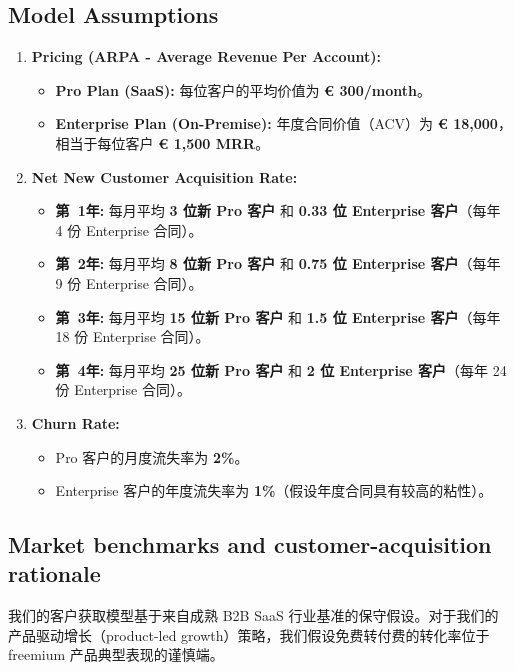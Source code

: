 \documentclass[11pt, a4paper, oneside]{article}
\begin{document}
\subsection{Model Assumptions}
\begin{enumerate}
    \item \textbf{Pricing (ARPA - Average Revenue Per Account):}
    \begin{itemize}
        \item \textbf{Pro Plan (SaaS):} 每位客户的平均价值为 \textbf{\euro{} 300/month}。
        \item \textbf{Enterprise Plan (On-Premise):} 年度合同价值（ACV）为 \textbf{\euro{} 18,000}，相当于每位客户 \textbf{\euro{} 1,500 MRR}。
    \end{itemize}

    \item \textbf{Net New Customer Acquisition Rate:}
    \begin{itemize}
        \item \textbf{第~1年:} 每月平均 \textbf{3 位新 Pro 客户} 和 \textbf{0.33 位 Enterprise 客户}（每年 4 份 Enterprise 合同）。
        \item \textbf{第~2年:} 每月平均 \textbf{8 位新 Pro 客户} 和 \textbf{0.75 位 Enterprise 客户}（每年 9 份 Enterprise 合同）。
        \item \textbf{第~3年:} 每月平均 \textbf{15 位新 Pro 客户} 和 \textbf{1.5 位 Enterprise 客户}（每年 18 份 Enterprise 合同）。
        \item \textbf{第~4年:} 每月平均 \textbf{25 位新 Pro 客户} 和 \textbf{2 位 Enterprise 客户}（每年 24 份 Enterprise 合同）。
    \end{itemize}

    \item \textbf{Churn Rate:}
    \begin{itemize}
        \item Pro 客户的月度流失率为 \textbf{2\%}。
        \item Enterprise 客户的年度流失率为 \textbf{1\%}（假设年度合同具有较高的粘性）。
    \end{itemize}
\end{enumerate}

\subsection{Market benchmarks and customer-acquisition rationale}

我们的客户获取模型基于来自成熟 B2B SaaS 行业基准的保守假设。对于我们的产品驱动增长（product-led growth）策略，我们假设免费转付费的转化率位于 freemium 产品典型表现的谨慎端。
\end{document}
